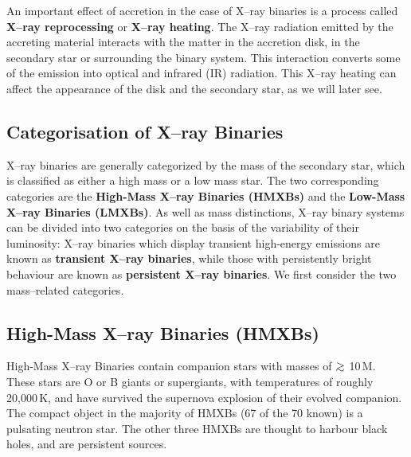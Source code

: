 An important effect of accretion in the case of X--ray binaries is a
process called \textbf{X--ray reprocessing} or \textbf{X--ray heating}. The X--ray radiation emitted by the
accreting material interacts with the matter in the accretion disk, in
the secondary star or surrounding the binary system. This interaction
converts some of the emission into optical and infrared (IR) radiation. This
X--ray heating can affect the appearance of the disk and the secondary
star, as we will later see. %


\subsection{Categorisation of X--ray Binaries}
\label{cha:Introduction:sec:X--rayBinaries:subsec:CategorizationOfX--rayBinaries}

X--ray binaries are generally categorized by the mass of the
secondary star, which is classified as either a high mass or a low
mass star. The two corresponding categories are the \textbf{High-Mass
X--ray Binaries (HMXBs)} and the \textbf{Low-Mass X--ray Binaries (LMXBs)}. %
As well as mass distinctions, X--ray binary systems can be divided into
two categories on the basis of the variability of their luminosity: %
X--ray binaries which display transient high-energy emissions are known as
\textbf{transient X--ray binaries}, while those with persistently bright behaviour are known as
\textbf{persistent X--ray binaries}. We first consider the two mass--related categories. %


\subsection{High-Mass X--ray Binaries (HMXBs)}
\label{cha:Introduction:sec:X--rayBinaries:subsec:HMXBs}

High-Mass X--ray Binaries contain companion stars with masses of $\gsim$
10\,M\sun. These stars are O or B giants or supergiants, %
with temperatures of roughly 20,000\,K, %
and have survived the supernova explosion of their evolved
companion. %
The compact object in the majority of HMXBs (67 of the 70 known) is a pulsating neutron
star.
The other three HMXBs are thought to harbour black holes, and are persistent sources. %

